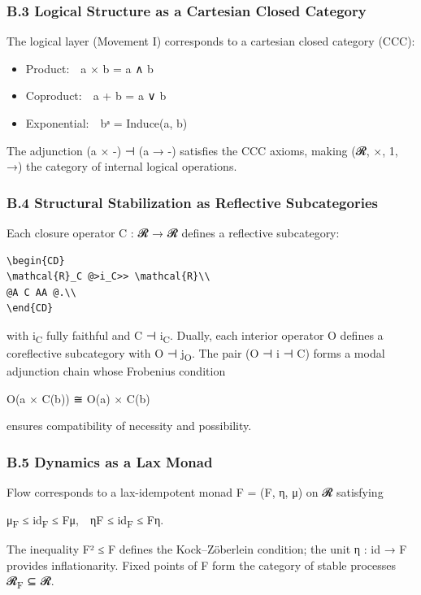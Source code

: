 \documentclass[11pt]{article}
\begin{document}
\subsubsection*{B.3 Logical Structure as a Cartesian Closed Category}
\label{sec:orgc768bd0}
The logical layer (Movement I) corresponds to a cartesian closed category (CCC):

\begin{itemize}
\item Product: a × b = a ∧ b
\item Coproduct: a + b = a ∨ b
\item Exponential: bᵃ = Induce(a, b)
\end{itemize}

The adjunction (a × -) ⊣ (a → -) satisfies the CCC axioms,  
making (𝓡, ×, 1, →) the category of internal logical operations.
\subsubsection*{B.4 Structural Stabilization as Reflective Subcategories}
\label{sec:org3f85a86}
Each closure operator C : 𝓡 → 𝓡 defines a reflective subcategory:

\begin{verbatim}
\begin{CD}
\mathcal{R}_C @>i_C>> \mathcal{R}\\
@A C AA @.\\
\end{CD}
\end{verbatim}

with i\textsubscript{C} fully faithful and C ⊣ i\textsubscript{C}.  
Dually, each interior operator O defines a coreflective subcategory with O ⊣ j\textsubscript{O}.  
The pair (O ⊣ i ⊣ C) forms a modal adjunction chain whose Frobenius condition

O(a × C(b)) ≅ O(a) × C(b)

ensures compatibility of necessity and possibility.
\subsubsection*{B.5 Dynamics as a Lax Monad}
\label{sec:org6751152}
Flow corresponds to a lax-idempotent monad F = (F, η, μ) on 𝓡 satisfying

μ\textsubscript{F} ≤ id\textsubscript{F} ≤ Fμ, ηF ≤ id\textsubscript{F} ≤ Fη.

The inequality F² ≤ F defines the Kock–Zöberlein condition;  
the unit η : id → F provides inflationarity.  
Fixed points of F form the category of stable processes 𝓡\textsubscript{F} ⊆ 𝓡.
\end{document}
